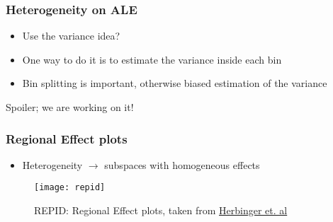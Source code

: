 \begin{frame}
  \frametitle{Heterogeneity on ALE}
  \begin{itemize}
    \item Use the variance idea?
    \item One way to do it is to estimate the variance inside each bin
    \item Bin splitting is important, otherwise biased estimation of the variance
  \end{itemize}
  \noindent\makebox[\linewidth]{\rule{\paperwidth}{0.4pt}}
  Spoiler; we are working on it!
\end{frame}


\begin{frame}
  \frametitle{Regional Effect plots}
  \begin{itemize}
    \item Heterogeneity $\rightarrow$ subspaces with homogeneous effects
  \end{itemize}

  \begin{figure}
    \centering
    \texttt{[image: repid]}
    \caption{REPID: Regional Effect plots, taken from \href{https://arxiv.org/abs/2202.07254}{Herbinger et. al}}
  \end{figure}
\end{frame}

